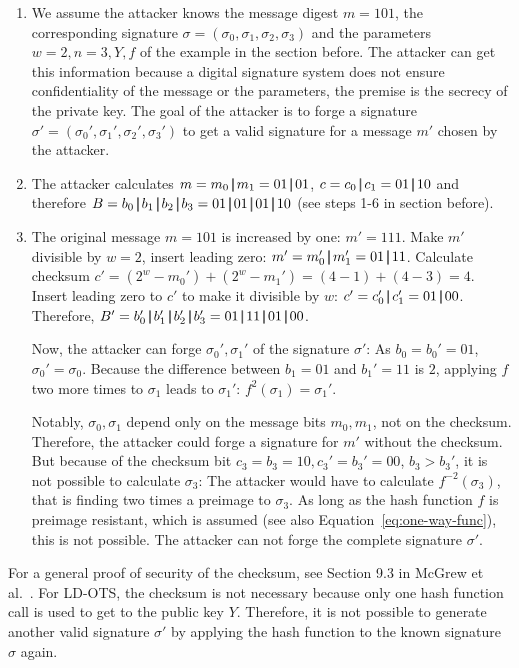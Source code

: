 \begin{enumerate}
\item We assume the attacker knows the message digest $m = 101$, the corresponding signature $\sigma = (\sigma_0, \sigma_1, \sigma_2, \sigma_3)$ and the parameters $w=2, n=3, Y, f$ of the example in the section before. The attacker can get this information because a digital signature system does not ensure confidentiality of the message or the parameters, the premise is the secrecy of the private key. The goal of the attacker is to forge a signature $\sigma' = (\sigma_0', \sigma_1', \sigma_2', \sigma_3')$ to get a valid signature for a message $m'$ chosen by the attacker. 

\item The attacker calculates $m  = m_0 \operatorname{|\!\!|} m_1 = 01 \operatorname{|\!\!|} 01$, $c = c_0 \operatorname{|\!\!|} c_1 = 01 \operatorname{|\!\!|} 10$ and therefore $B =  b_0 \concat b_1 \concat b_2 \concat b_3 = 01 \concat 01 \concat 01 \concat 10$ (see steps 1-6 in section before).

\item The original message $m = 101$ is increased by one: $m' = 111$. Make $m'$ divisible by $w = 2$, insert leading zero: $m' = m_0'\operatorname{|\!\!|} m_1' = 01 \operatorname{|\!\!|} 11$. Calculate checksum $c' = (2^w - m_0') + (2^w - m_1') = (4-1)+(4-3)=4$.
Insert leading zero to $c'$ to make it divisible by $w$: $c' = c_0' \operatorname{|\!\!|} c_1' = 01 \operatorname{|\!\!|} 00$. Therefore, $B' = b_0' \concat b_1' \concat b_2' \concat b_3' = 01 \concat 11 \concat 01 \concat 00$.

Now, the attacker can forge $\sigma_0', \sigma_1'$ of the signature $\sigma'$:
As $b_0 = b_0' = 01$, $\sigma_0' = \sigma_0$.
Because the difference between $b_1 = 01$ and $b_1' = 11$ is $2$, applying $f$ two more times to $\sigma_1$ leads to $\sigma_1'$: $f^2(\sigma_1) = \sigma_1'$.

Notably, $\sigma_0, \sigma_1$ depend only on the message bits $m_0, m_1$, not on the checksum. Therefore, the attacker could forge a signature for $m'$ without the checksum. But because of the checksum bit $c_3 = b_3 = 10, c_3' = b_3' = 00$, $b_3 > b_3'$, it is not possible to calculate $\sigma_3$: The attacker would have to calculate $f^{-2}(\sigma_3)$, that is finding two times a preimage to $\sigma_3$. As long as the hash function $f$ is preimage resistant, which is assumed (see also Equation~\ref{eq:one-way-func}), this is not possible. The attacker can not forge the complete signature $\sigma'$.

\end{enumerate}
For a general proof of security of the checksum, see Section 9.3 in McGrew et al.~\cite{LMS_RFC8554}.
For LD-OTS, the checksum is not necessary because only one hash function call is used to get to the public key $Y$. Therefore, it is not possible to generate another valid signature $\sigma'$ by applying the hash function to the known signature $\sigma$ again.

